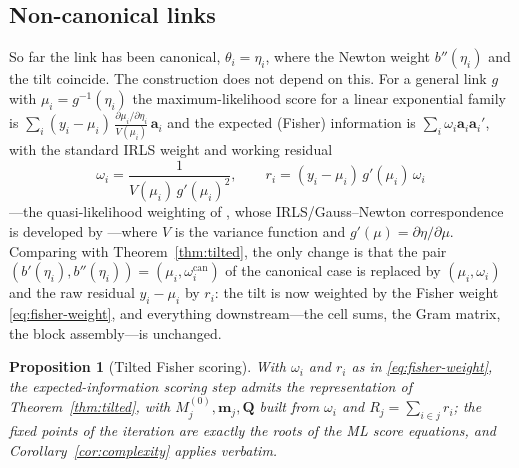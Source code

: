 \documentclass[11pt]{article}
\newtheorem{proposition}{Proposition}
\newcommand{\ba}{\mathbf{a}}
\newcommand{\bQ}{\mathbf{Q}}
\begin{document}
\subsection{Non-canonical links}\label{sec:noncanonical}

So far the link has been canonical, $\theta_i = \eta_i$, where the
Newton weight $b''(\eta_i)$ and the tilt coincide.  The construction does
not depend on this.  For a general link $g$ with $\mu_i = g^{-1}(\eta_i)$
the maximum-likelihood score for a linear exponential family is
$\sum_i (y_i - \mu_i)\,\frac{\partial\mu_i/\partial\eta_i}{V(\mu_i)}\,
\ba_i$ and the expected (Fisher) information is
$\sum_i \omega_i \ba_i\ba_i'$, with the standard IRLS weight and
working residual
\begin{equation}\label{eq:fisher-weight}
\omega_i = \frac{1}{V(\mu_i)\, g'(\mu_i)^2}, \qquad
r_i = (y_i - \mu_i)\, g'(\mu_i)\,\omega_i
\end{equation}
\citep[Sec.~2.5]{mccullagh1989}---the quasi-likelihood weighting of
\citet{wedderburn1974}, whose IRLS/Gauss--Newton correspondence is
developed by \citet{green1984}---where $V$ is the variance function and
$g'(\mu) = \partial\eta/\partial\mu$.  Comparing with
Theorem~\ref{thm:tilted}, the only change is that the pair
$(b'(\eta_i), b''(\eta_i)) = (\mu_i, \omega_i^{\mathrm{can}})$ of the
canonical case is replaced by $(\mu_i, \omega_i)$ and the raw residual
$y_i - \mu_i$ by $r_i$: the tilt is now weighted by the Fisher weight
\eqref{eq:fisher-weight}, and everything downstream---the cell sums, the
Gram matrix, the block assembly---is unchanged.

\begin{proposition}[Tilted Fisher scoring]\label{prop:noncanonical}
With $\omega_i$ and $r_i$ as in \eqref{eq:fisher-weight}, the
expected-information scoring step admits the representation of
Theorem~\ref{thm:tilted}, with $M_j^{(0)}, \mathbf{m}_j, \bQ$ built from
$\omega_i$ and $R_j = \sum_{i \in j} r_i$; the fixed points of the
iteration are exactly the roots of the ML score equations, and
Corollary~\ref{cor:complexity} applies verbatim.
\end{proposition}
\end{document}
